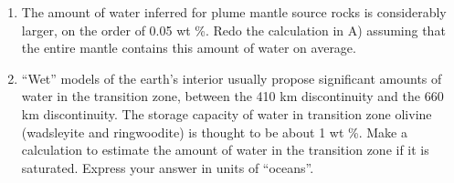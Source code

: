\documentclass{template}
\newcommand{\solution}[1]{%
\iftoggle{showanswers}{%
\begin{solutionbox}
        #1
\end{solutionbox}%
  }{}%
}
\begin{document}
\begin{enumerate}[label=\textbf{\arabic*.}]
\begin{enumerate}[label=\Alph*)]
    \item The amount of water inferred for plume mantle source rocks is considerably larger, on the order of 0.05 wt \%. Redo the calculation in A) assuming that the entire mantle contains this amount of water on average.

    \solution{
        \begin{align*}
            \qty{4004e21}{\kg} \cdot \frac{\qty{0.05}{\percent}}{100} &\approx \boxed{\qty{2.002e21}{\kg}}
        \end{align*}

        This increases the estimate to $\sim1.4$ times greater than the mass of water in Earth's oceans.
    }

    \item “Wet” models of the earth’s interior usually propose significant amounts of water in the transition zone, between the 410 km discontinuity and the 660 km discontinuity. The storage capacity of water in transition zone olivine (wadsleyite and ringwoodite) is thought to be about 1 wt \%. Make a calculation to estimate the amount of water in the transition zone if it is saturated. Express your answer in units of “oceans”.

    \solution{

        Volume of the transition zone (estimated using a spherical shell, with radii measured from Earth's center:

        \begin{align*}
            V &= \frac{4}{3}\pi \left[ (6371 - 410)^3 - (6371 - 660)^3 \right] \qty{}{\km\cubed}\\
            &= \frac{4}{3}\pi \left[ 5961^3 - 5711^3 \right] \qty{}{\km\cubed}\\
            &\approx \qty{1.07e11}{\km\cubed}
        \end{align*}

        Assuming a pyrolite model, wadsleyite + ringwoodite make up $\sim 60$ vol.\% of the transition zone \parencite{ChangetalComparativeCompressibility2015}:

        \begin{align*}
            V_{\text{ol}} &= 0.6 \times \qty{1.07e11}{\km\cubed}\\
            &\approx \qty{6.42e10}{\km\cubed} = \qty{6.42e19}{\m\cubed}
        \end{align*}

        Convert to mass, assuming an average $\rho \approx \qty{4000}{\kg\per\m\cubed}$ for the olivine phases in the transition zone \parencite{ALEXSTREKEISENOlivine}:

}
\end{enumerate}
\end{enumerate}
\end{document}
